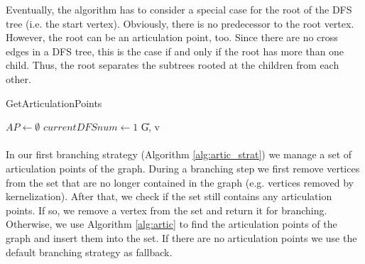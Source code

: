 \documentclass[]{article}
\begin{document}
Eventually, the algorithm has to consider a special case for the root of the DFS tree (i.e. the start vertex). Obviously, there is no predecessor to the root vertex. However, the root can be an articulation point, too. Since there are no cross edges in a DFS tree, this is the case if and only if the root has more than one child. Thus, the root separates the subtrees rooted at the children from each other.

\begin{algorithm}
	\caption{GetArticulationPoints}\label{alg:artic}
	\DontPrintSemicolon
	
	
	$AP \leftarrow \emptyset$\;
	$currentDFSnum \leftarrow 1$\;
	\U{G, v}	
	
	\;
	
\end{algorithm}

\paragraph{}
In our first branching strategy (Algorithm \ref{alg:artic_strat}) we manage a set of articulation points of the graph. During a branching step we first remove vertices from the set that are no longer contained in the graph (e.g. vertices removed by kernelization). After that, we check if the set still contains any articulation points. If so, we remove a vertex from the set and return it for branching. Otherwise, we use Algorithm \ref{alg:artic} to find the articulation points of the graph and insert them into the set. If there are no articulation points we use the default branching strategy as fallback. 
\end{document}
